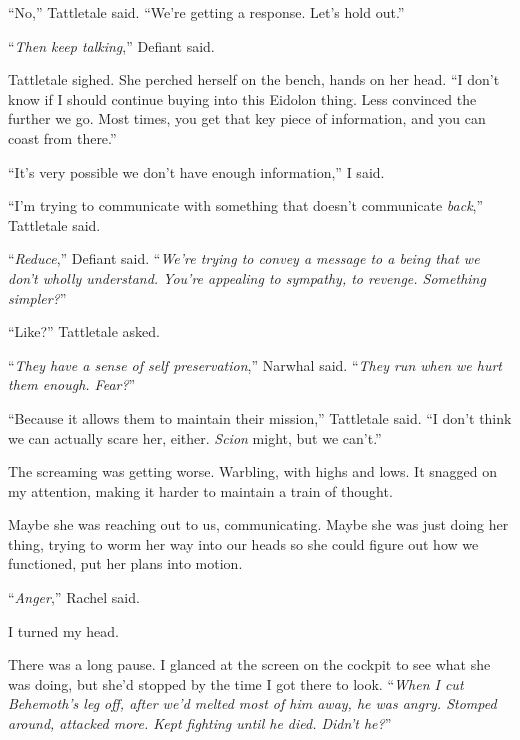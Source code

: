 ``No,'' Tattletale said.  ``We're getting a response.  Let's hold out.''



``\emph{Then keep talking},'' Defiant said.



Tattletale sighed.  She perched herself on the bench, hands on her head.  ``I don't know if I should continue buying into this Eidolon thing.  Less convinced the further we go.  Most times, you get that key piece of information, and you can coast from there.''



``It's very possible we don't have enough information,'' I said.



``I'm trying to communicate with something that doesn't communicate \emph{back},'' Tattletale said.



``\emph{Reduce},'' Defiant said.  ``\emph{We're trying to convey a message to a being that we don't wholly understand.  You're appealing to sympathy, to revenge.  Something simpler?}''



``Like?'' Tattletale asked.



``\emph{They have a sense of self preservation},'' Narwhal said.  ``\emph{They run when we hurt them enough.  Fear?}''



``Because it allows them to maintain their mission,'' Tattletale said.  ``I don't think we can actually scare her, either.  \emph{Scion} might, but we can't.''



The screaming was getting worse.  Warbling, with highs and lows.  It snagged on my attention, making it harder to maintain a train of thought.



Maybe she was reaching out to us, communicating.  Maybe she was just doing her thing, trying to worm her way into our heads so she could figure out how we functioned, put her plans into motion.



``\emph{Anger},'' Rachel said.



I turned my head.



There was a long pause.  I glanced at the screen on the cockpit to see what she was doing, but she'd stopped by the time I got there to look.  ``\emph{When I cut Behemoth's leg off, after we'd melted most of him away, he was angry.  Stomped around, attacked more.  Kept fighting until he died.  Didn't he?}''



